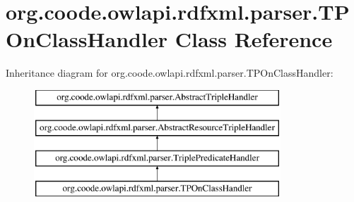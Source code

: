 \hypertarget{classorg_1_1coode_1_1owlapi_1_1rdfxml_1_1parser_1_1_t_p_on_class_handler}{\section{org.\-coode.\-owlapi.\-rdfxml.\-parser.\-T\-P\-On\-Class\-Handler Class Reference}
\label{classorg_1_1coode_1_1owlapi_1_1rdfxml_1_1parser_1_1_t_p_on_class_handler}
}
Inheritance diagram for org.\-coode.\-owlapi.\-rdfxml.\-parser.\-T\-P\-On\-Class\-Handler\-:\begin{figure}[H]
\begin{center}
\leavevmode
\includegraphics[height=4.000000cm]{classorg_1_1coode_1_1owlapi_1_1rdfxml_1_1parser_1_1_t_p_on_class_handler}
\end{center}
\end{figure}
